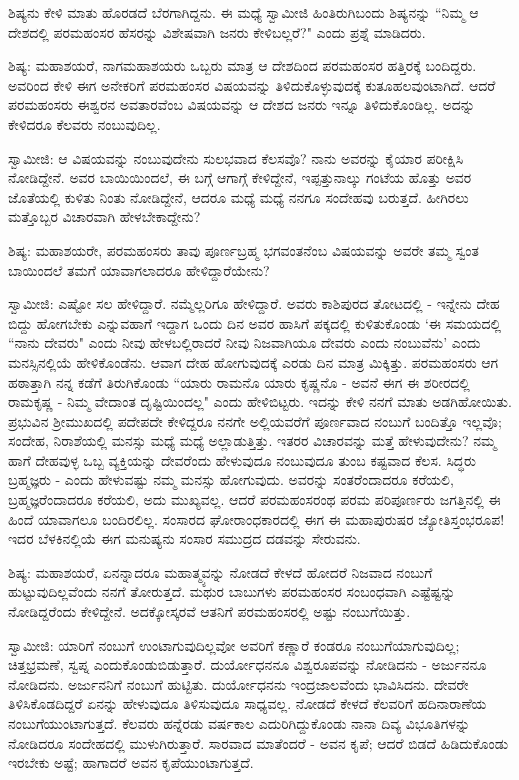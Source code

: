 ಶಿಷ್ಯನು ಕೇಳಿ ಮಾತು ಹೊರಡದೆ ಬೆರಗಾಗಿದ್ದನು. ಈ ಮಧ್ಯೆ ಸ್ವಾಮೀಜಿ ಹಿಂತಿರುಗಿಬಂದು ಶಿಷ್ಯನನ್ನು “ನಿಮ್ಮ ಆ ದೇಶದಲ್ಲಿ ಪರಮಹಂಸರ ಹೆಸರನ್ನು ವಿಶೇಷವಾಗಿ ಜನರು ಕೇಳಿಬಲ್ಲರೆ?" ಎಂದು ಪ್ರಶ್ನೆ ಮಾಡಿದರು.

ಶಿಷ್ಯ: ಮಹಾಶಯರೆ, ನಾಗಮಹಾಶಯರು ಒಬ್ಬರು ಮಾತ್ರ ಆ ದೇಶದಿಂದ ಪರಮಹಂಸರ ಹತ್ತಿರಕ್ಕೆ ಬಂದಿದ್ದರು. ಅವರಿಂದ ಕೇಳಿ ಈಗ ಅನೇಕರಿಗೆ ಪರಮಹಂಸರ ವಿಷಯವನ್ನು ತಿಳಿದುಕೊಳ್ಳುವುದಕ್ಕೆ ಕುತೂಹಲವುಂಟಾಗಿದೆ. ಆದರೆ ಪರಮಹಂಸರು ಈಶ್ವರನ ಅವತಾರವೆಂಬ ವಿಷಯವನ್ನು ಆ ದೇಶದ ಜನರು ಇನ್ನೂ ತಿಳಿದುಕೊಂಡಿಲ್ಲ. ಅದನ್ನು ಕೇಳಿದರೂ ಕೆಲವರು ನಂಬುವುದಿಲ್ಲ.

ಸ್ವಾಮೀಜಿ: ಆ ವಿಷಯವನ್ನು ನಂಬುವುದೇನು ಸುಲಭವಾದ ಕೆಲಸವೊ? ನಾನು ಅವರನ್ನು ಕೈಯಾರ ಪರೀಕ್ಷಿಸಿ ನೋಡಿದ್ದೇನೆ. ಅವರ ಬಾಯಿಯಿಂದಲೆ, ಈ ಬಗ್ಗೆ ಆಗಾಗ್ಗೆ ಕೇಳಿದ್ದೇನೆ, ಇಪ್ಪತ್ತುನಾಲ್ಕು ಗಂಟೆಯ ಹೊತ್ತು ಅವರ ಜೊತೆಯಲ್ಲಿ ಕುಳಿತು ನಿಂತು ನೋಡಿದ್ದೇನೆ, ಆದರೂ ಮಧ್ಯೆ ಮಧ್ಯೆ ನನಗೂ ಸಂದೇಹವು ಬರುತ್ತದೆ. ಹೀಗಿರಲು ಮತ್ತೊಬ್ಬರ ವಿಚಾರವಾಗಿ ಹೇಳಬೇಕಾದ್ದೇನು?

ಶಿಷ್ಯ: ಮಹಾಶಯರೇ, ಪರಮಹಂಸರು ತಾವು ಪೂರ್ಣಬ್ರಹ್ಮ ಭಗವಂತನೆಂಬ ವಿಷಯವನ್ನು ಅವರೇ ತಮ್ಮ ಸ್ವಂತ ಬಾಯಿಂದಲೆ ತಮಗೆ ಯಾವಾಗಲಾದರೂ ಹೇಳಿದ್ದಾರೆಯೇನು?

ಸ್ವಾಮೀಜಿ: ಎಷ್ಟೋ ಸಲ ಹೇಳಿದ್ದಾರೆ. ನಮ್ಮೆಲ್ಲರಿಗೂ ಹೇಳಿದ್ದಾರೆ. ಅವರು ಕಾಶಿಪುರದ ತೋಟದಲ್ಲಿ - ಇನ್ನೇನು ದೇಹ ಬಿದ್ದು ಹೋಗಬೇಕು ಎನ್ನುವಹಾಗೆ ಇದ್ದಾಗ ಒಂದು ದಿನ ಅವರ ಹಾಸಿಗೆ ಪಕ್ಕದಲ್ಲಿ ಕುಳಿತುಕೊಂಡು ‘ಈ ಸಮಯದಲ್ಲಿ “ನಾನು ದೇವರು" ಎಂದು ನೀವು ಹೇಳಬಲ್ಲಿರಾದರೆ ನೀವು ನಿಜವಾಗಿಯೂ ದೇವರು ಎಂದು ನಂಬುವೆನು’ ಎಂದು ಮನಸ್ಸಿನಲ್ಲಿಯೆ ಹೇಳಿಕೊಂಡೆನು. ಆವಾಗ ದೇಹ ಹೋಗುವುದಕ್ಕೆ ಎರಡು ದಿನ ಮಾತ್ರ ಮಿಕ್ಕಿತ್ತು. ಪರಮಹಂಸರು ಆಗ ಹಠಾತ್ತಾಗಿ ನನ್ನ ಕಡೆಗೆ ತಿರುಗಿಕೊಂಡು “ಯಾರು ರಾಮನೊ ಯಾರು ಕೃಷ್ಣನೊ - ಅವನೆ ಈಗ ಈ ಶರೀರದಲ್ಲಿ ರಾಮಕೃಷ್ಣ - ನಿಮ್ಮ ವೇದಾಂತ ದೃಷ್ಟಿಯಿಂದಲ್ಲ" ಎಂದು ಹೇಳಿಬಿಟ್ಟರು. ಇದನ್ನು ಕೇಳಿ ನನಗೆ ಮಾತು ಅಡಗಿಹೋಯಿತು. ಪ್ರಭುವಿನ ಶ‍್ರೀಮುಖದಲ್ಲಿ ಪದೇಪದೇ ಕೇಳಿದ್ದರೂ ನನಗೇ ಅಲ್ಲಿಯವರೆಗೆ ಪೂರ್ಣವಾದ ನಂಬುಗೆ ಬಂದಿತ್ತೊ ಇಲ್ಲವೊ; ಸಂದೇಹ, ನಿರಾಶೆಯಲ್ಲಿ ಮನಸ್ಸು ಮಧ್ಯೆ ಮಧ್ಯೆ ಅಲ್ಲಾಡುತ್ತಿತ್ತು. ಇತರರ ವಿಚಾರವನ್ನು ಮತ್ತೆ ಹೇಳುವುದೇನು? ನಮ್ಮ ಹಾಗೆ ದೇಹವುಳ್ಳ ಒಬ್ಬ ವ್ಯಕ್ತಿಯನ್ನು ದೇವರೆಂದು ಹೇಳುವುದೂ ನಂಬುವುದೂ ತುಂಬ ಕಷ್ಟವಾದ ಕೆಲಸ. ಸಿದ್ಧರು ಬ್ರಹ್ಮಜ್ಞರು - ಎಂದು ಹೇಳುವಷ್ಟು ನಮ್ಮ ಮನಸ್ಸು ಹೋಗುವುದು. ಅವರನ್ನು ಸಂತರೆಂದಾದರೂ ಕರೆಯಲಿ, ಬ್ರಹ್ಮಜ್ಞರೆಂದಾದರೂ ಕರೆಯಲಿ, ಅದು ಮುಖ್ಯವಲ್ಲ. ಆದರೆ ಪರಮಹಂಸರಂಥ ಪರಮ ಪರಿಪೂರ್ಣರು ಜಗತ್ತಿನಲ್ಲಿ ಈ ಹಿಂದೆ ಯಾವಾಗಲೂ ಬಂದಿರಲಿಲ್ಲ. ಸಂಸಾರದ ಘೋರಾಂಧಕಾರದಲ್ಲಿ ಈಗ ಈ ಮಹಾಪುರುಷರ ಜ್ಯೋತಿಸ್ತಂಭರೂಪ! ಇದರ ಬೆಳಕಿನಲ್ಲಿಯೆ ಈಗ ಮನುಷ್ಯನು ಸಂಸಾರ ಸಮುದ್ರದ ದಡವನ್ನು ಸೇರುವನು.

ಶಿಷ್ಯ: ಮಹಾಶಯರೆ, ಏನನ್ನಾದರೂ ಮಹಾತ್ಮ್ಯವನ್ನು ನೋಡದೆ ಕೇಳದೆ ಹೋದರೆ ನಿಜವಾದ ನಂಬುಗೆ ಹುಟ್ಟುವುದಿಲ್ಲವೆಂದು ನನಗೆ ತೋರುತ್ತದೆ. ಮಥುರ ಬಾಬುಗಳು ಪರಮಹಂಸರ ಸಂಬಂಧವಾಗಿ ಎಷ್ಟೆಷ್ಟನ್ನು ನೋಡಿದ್ದರೆಂದು ಕೇಳಿದ್ದೇನೆ. ಅದಕ್ಕೋಸ್ಕರವೆ ಆತನಿಗೆ ಪರಮಹಂಸರಲ್ಲಿ ಅಷ್ಟು ನಂಬುಗೆಯಿತ್ತು.

ಸ್ವಾಮೀಜಿ: ಯಾರಿಗೆ ನಂಬುಗೆ ಉಂಟಾಗುವುದಿಲ್ಲವೋ ಅವರಿಗೆ ಕಣ್ಣಾರೆ ಕಂಡರೂ ನಂಬುಗೆಯಾಗುವುದಿಲ್ಲ; ಚಿತ್ತಭ್ರಮಣೆ, ಸ್ವಪ್ನ ಎಂದುಕೊಂಡುಬಿಡುತ್ತಾರೆ. ದುರ್ಯೋಧನನೂ ವಿಶ್ವರೂಪವನ್ನು ನೋಡಿದನು - ಅರ್ಜುನನೂ ನೋಡಿದನು. ಅರ್ಜುನನಿಗೆ ನಂಬುಗೆ ಹುಟ್ಟಿತು. ದುರ್ಯೋಧನನು ಇಂದ್ರಜಾಲವೆಂದು ಭಾವಿಸಿದನು. ದೇವರೇ ತಿಳಿಸಿಕೊಡದಿದ್ದರೆ ಏನನ್ನು ಹೇಳುವುದೂ ತಿಳಿಸುವುದೂ ಸಾಧ್ಯವಲ್ಲ. ನೋಡದೆ ಕೇಳದೆ ಕೆಲವರಿಗೆ ಹದಿನಾರಾಣೆಯ ನಂಬುಗೆಯುಂಟಾಗುತ್ತದೆ. ಕೆಲವರು ಹನ್ನೆರಡು ವರ್ಷಕಾಲ ಎದುರಿಗಿದ್ದುಕೊಂಡು ನಾನಾ ದಿವ್ಯ ವಿಭೂತಿಗಳನ್ನು ನೋಡಿದರೂ ಸಂದೇಹದಲ್ಲಿ ಮುಳುಗಿರುತ್ತಾರೆ. ಸಾರವಾದ ಮಾತೆಂದರೆ - ಅವನ ಕೃಪೆ; ಆದರೆ ಬಿಡದೆ ಹಿಡಿದುಕೊಂಡು ಇರಬೇಕು ಅಷ್ಟೆ; ಹಾಗಾದರೆ ಅವನ ಕೃಪೆಯುಂಟಾಗುತ್ತದೆ.

